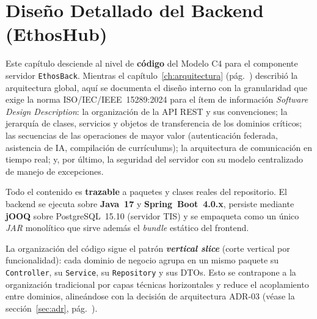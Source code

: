 \chapter{Diseño Detallado del Backend (EthosHub)}
\label{ch:backend}

Este capítulo desciende al nivel de \textbf{código} del Modelo C4 para el componente
servidor \texttt{EthosBack}. Mientras el capítulo~\ref{ch:arquitectura} (pág.~\pageref{ch:arquitectura})
describió la arquitectura global, aquí se documenta el diseño interno con la granularidad
que exige la norma ISO/IEC/IEEE~15289:2024 para el ítem de información \textit{Software
Design Description}: la organización de la API REST y sus convenciones; la jerarquía de
clases, servicios y objetos de transferencia de los dominios críticos; las secuencias de
las operaciones de mayor valor (autenticación federada, asistencia de IA, compilación de
currículums); la arquitectura de comunicación en tiempo real; y, por último, la seguridad
del servidor con su modelo centralizado de manejo de excepciones.

Todo el contenido es \textbf{trazable} a paquetes y clases reales del repositorio. El
backend se ejecuta sobre \textbf{Java~17} y \textbf{Spring~Boot~4.0.x}, persiste mediante
\textbf{jOOQ} sobre PostgreSQL~15.10 (servidor TIS) y se empaqueta como un único \textit{JAR}
monolítico que sirve además el \textit{bundle} estático del frontend.

\begin{NotaTecnica}
La organización del código sigue el patrón \textbf{\textit{vertical slice}} (corte
vertical por funcionalidad): cada dominio de negocio agrupa en un mismo paquete su
\texttt{Controller}, su \texttt{Service}, su \texttt{Repository} y sus DTOs. Esto se
contrapone a la organización tradicional por capas técnicas horizontales y reduce el
acoplamiento entre dominios, alineándose con la decisión de arquitectura ADR-03
(véase la sección~\ref{sec:adr}, pág.~\pageref{sec:adr}).
\end{NotaTecnica}

